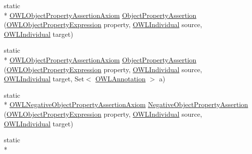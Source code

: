 \begin{DoxyCompactItemize}
\item 
static \\*
\hyperlink{interfaceorg_1_1semanticweb_1_1owlapi_1_1model_1_1_o_w_l_object_property_assertion_axiom}{O\-W\-L\-Object\-Property\-Assertion\-Axiom} \hyperlink{classorg_1_1semanticweb_1_1owlapi_1_1apibinding_1_1_o_w_l_functional_syntax_factory_a0b3fa3ee56563b7e3b4c1d476896d4b5}{Object\-Property\-Assertion} (\hyperlink{interfaceorg_1_1semanticweb_1_1owlapi_1_1model_1_1_o_w_l_object_property_expression}{O\-W\-L\-Object\-Property\-Expression} property, \hyperlink{interfaceorg_1_1semanticweb_1_1owlapi_1_1model_1_1_o_w_l_individual}{O\-W\-L\-Individual} source, \hyperlink{interfaceorg_1_1semanticweb_1_1owlapi_1_1model_1_1_o_w_l_individual}{O\-W\-L\-Individual} target)
\item 
static \\*
\hyperlink{interfaceorg_1_1semanticweb_1_1owlapi_1_1model_1_1_o_w_l_object_property_assertion_axiom}{O\-W\-L\-Object\-Property\-Assertion\-Axiom} \hyperlink{classorg_1_1semanticweb_1_1owlapi_1_1apibinding_1_1_o_w_l_functional_syntax_factory_acecbede5c9412df06edb1c9785dd9d6d}{Object\-Property\-Assertion} (\hyperlink{interfaceorg_1_1semanticweb_1_1owlapi_1_1model_1_1_o_w_l_object_property_expression}{O\-W\-L\-Object\-Property\-Expression} property, \hyperlink{interfaceorg_1_1semanticweb_1_1owlapi_1_1model_1_1_o_w_l_individual}{O\-W\-L\-Individual} source, \hyperlink{interfaceorg_1_1semanticweb_1_1owlapi_1_1model_1_1_o_w_l_individual}{O\-W\-L\-Individual} target, Set$<$ \hyperlink{interfaceorg_1_1semanticweb_1_1owlapi_1_1model_1_1_o_w_l_annotation}{O\-W\-L\-Annotation} $>$ a)
\item 
static \\*
\hyperlink{interfaceorg_1_1semanticweb_1_1owlapi_1_1model_1_1_o_w_l_negative_object_property_assertion_axiom}{O\-W\-L\-Negative\-Object\-Property\-Assertion\-Axiom} \hyperlink{classorg_1_1semanticweb_1_1owlapi_1_1apibinding_1_1_o_w_l_functional_syntax_factory_a8a04faa0e54d6e2cba1ceeb77cb4aed3}{Negative\-Object\-Property\-Assertion} (\hyperlink{interfaceorg_1_1semanticweb_1_1owlapi_1_1model_1_1_o_w_l_object_property_expression}{O\-W\-L\-Object\-Property\-Expression} property, \hyperlink{interfaceorg_1_1semanticweb_1_1owlapi_1_1model_1_1_o_w_l_individual}{O\-W\-L\-Individual} source, \hyperlink{interfaceorg_1_1semanticweb_1_1owlapi_1_1model_1_1_o_w_l_individual}{O\-W\-L\-Individual} target)
\item 
static \\*

\end{DoxyCompactItemize}
